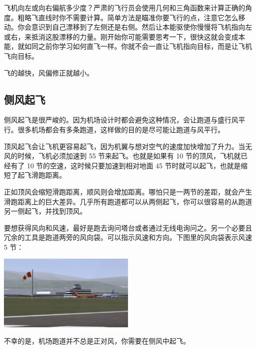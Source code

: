 飞机向左或向右偏航多少度？严肃的飞行员会使用几何和三角函数来计算正确的角度。粗略飞直线时你不需要计算。简单方法是瞄准你要飞行的点，注意它怎么移动。你会意识到自己漂移到了左侧还是右侧。然后让本能驱使你慢慢将飞机指向左或右，来抵消这股漂移的力量。刚开始你可能需要思考一下，很快这就会变成本能，就如同之前你学习如何直飞一样。你就不会一直让飞机指向目标，而是让飞机飞向目标。

飞的越快，风偏修正就越小。

\subsection{侧风起飞}
\label{sec:Swsw}

侧风起飞是很严峻的。因为机场设计时都会避免这种情况，会让跑道与盛行风平行。很多机场都会有多条跑道，这样做的目的是尽可能让跑道与风平行。

顶风起飞会让飞机更容易起飞，因为机翼与想对空气的速度加快增加了升力。当无风的时候，飞机必须加速到 55 节来起飞。也就是如果有 10 节的顶风，飞机就已经有了 10 节的空速，这时候只要加速到相对地面 45 节时就可以起飞，也就是缩短了起飞滑跑距离。

正如顶风会缩短滑跑距离，顺风则会增加距离。哪怕只是一两节的差距，就会产生滑跑距离上的巨大差异。几乎所有跑道都可以从两侧起飞，你可以很容易的从跑道另一侧起飞，并找到顶风。

要想获得风向和风速，最好是跑去询问塔台或者通过无线电询问之。另一个必要且冗余的工具是跑道两旁的风向袋。可以指示风速和方向。下图里的风向袋表示风速 5 节：

\begin{center}
\includegraphics[width=0.5\textwidth]{img/tut_46}
\end{center}

不幸的是，机场跑道并不总是正对风，你需要在侧风中起飞。


